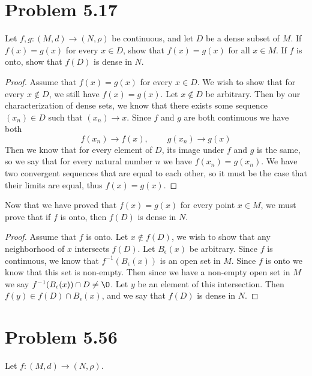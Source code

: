 \documentclass{article}
\begin{document}
\section*{Problem 5.17}
    Let $f,g:(M,d) \rightarrow (N, \rho)$ be continuous, and let $D$ be a dense subset of $M$.
    If $f(x) = g(x)$ for every $x \in D$, show that $f(x) = g(x)$ for all $x \in M$. If $f$ is onto,
    show that $f(D)$ is dense in $N$.
    \begin{proof}
        Assume that $f(x) = g(x)$ for every $x \in D$. We wish to show that for every $x \notin D$,
        we still have $f(x) = g(x)$. Let $x \notin D$ be arbitrary. Then by our characterization of 
        dense sets, we know that there exists some sequence $(x_n) \in D$ such that $(x_n)\rightarrow x$.
        Since $f$ and $g$ are both continuous we have both
        \[
            f(x_n) \rightarrow f(x), \ \ \ \ \ \ \ \ \ \ g(x_n) \rightarrow g(x)
        \]
        Then we know that for every element of $D$, its image under $f$ and $g$ is the same, so we say that
        for every natural number $n$ we have $f(x_n) = g(x_n)$. We have two convergent sequences that are equal 
        to each other,
        so it must be the case that their limits are equal, thus $f(x) = g(x)$.
    \end{proof}
    Now that we have proved that $f(x) = g(x)$ for every point $x \in M$, we must prove that if $f$
    is onto, then $f(D)$ is dense in $N$.
    \begin{proof}
        Assume that $f$ is onto. Let $x \notin f(D)$, we wish to show that any neighborhood of $x$ intersects
        $f(D)$. Let $B_\epsilon(x)$ be arbitrary. Since $f$ is continuous, we know that $f^{-1}(B_\epsilon(x))$
        is an open set in $M$. Since $f$ is onto we know that this set is non-empty. Then since we have a
        non-empty open set in $M$ we say $f^{-1}(B_\epsilon(x)) \cap D \neq \O$. Let $y$ be an element of this intersection.
        Then $f(y) \in f(D) \cap B_\epsilon(x)$, and we say that $f(D)$ is dense in $N$.
    \end{proof}
\section*{Problem 5.56}
    Let $f:(M,d) \rightarrow (N, \rho)$.
\end{document}
